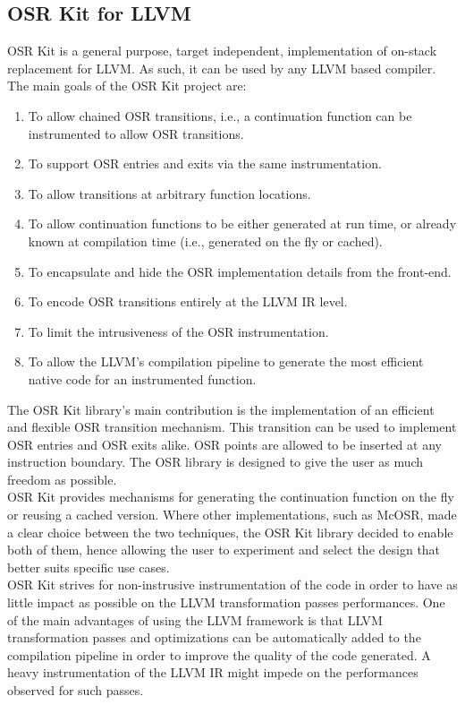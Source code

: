 \subsection{OSR Kit for LLVM}\label{describeOSRKit}
OSR Kit\cite{OSRKit} is a general purpose, target independent, implementation of on-stack replacement for LLVM.
As such, it can be used by any LLVM based compiler.
The main goals of the OSR Kit project are:
\begin{enumerate}
    \item To allow chained OSR transitions, i.e., a continuation function can be instrumented to allow OSR transitions.
    \item To support OSR entries and exits via the same instrumentation.
    \item To allow transitions at arbitrary function locations.
    \item To allow continuation functions to be either generated at run time, or already known at compilation time (i.e., generated on the fly or cached).
    \item To encapsulate and hide the OSR implementation details from the front-end.
    \item To encode OSR transitions entirely at the LLVM IR level.
    \item To limit the intrusiveness of the OSR instrumentation.
    \item To allow the LLVM's compilation pipeline to generate the most efficient native code for an instrumented function. \label{llvmTransformPasses}
\end{enumerate}

The OSR Kit library's main contribution is the implementation of an efficient and flexible OSR transition mechanism.
This transition can be used to implement OSR entries and OSR exits alike.
OSR points are allowed to be inserted at any instruction boundary. 
The OSR library is designed to give the user as much freedom as possible.\\

OSR Kit provides mechanisms for generating the continuation function on the fly or reusing a cached version.
Where other implementations, such as McOSR\cite{lameed2013modular}, made a clear choice between the two techniques, the OSR Kit library decided to enable both of them, hence allowing the user to experiment and select the design that better suits specific use cases.\\

OSR Kit strives for non-instrusive instrumentation of the code in order to have as little impact as possible on the LLVM transformation passes performances.
One of the main advantages of using the LLVM framework is that LLVM transformation passes and optimizations can be automatically added to the compilation pipeline in order to improve the quality of the code generated.
A heavy instrumentation of the LLVM IR might impede on the performances observed for such passes.\\

